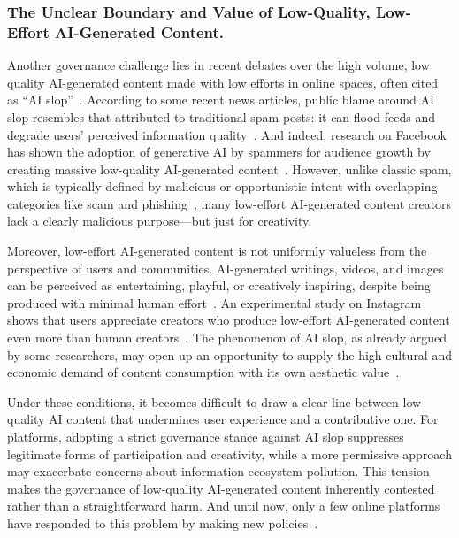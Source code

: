 \subsubsection{The Unclear Boundary and Value of Low-Quality, Low-Effort AI-Generated Content.}
\label{subsubsec:quality}
Another governance challenge lies in recent debates over the high volume, low quality AI-generated content made with low efforts in online spaces, often cited as ``AI slop''~\cite{Gross2025AISlopAP, mahdawi2025slop, hoffman2024first}. According to some recent news articles, public blame around AI slop resembles that attributed to traditional spam posts: it can flood feeds and degrade users' perceived information quality~\cite{mahdawi2025slop, hoffman2024first}. And indeed, research on Facebook has shown the adoption of generative AI by spammers for audience growth by creating massive low-quality AI-generated content~\cite{diresta2024spammers}. However, unlike classic spam, which is typically defined by malicious or opportunistic intent with overlapping categories like scam and phishing~\cite{inuwa2018detection, ferrara2019history}, many low-effort AI-generated content creators lack a clearly malicious purpose---but just for creativity. 

Moreover, low-effort AI-generated content is not uniformly valueless from the perspective of users and communities. AI-generated writings, videos, and images can be perceived as entertaining, playful, or creatively inspiring, despite being produced with minimal human effort~\cite{kommers2026ai, park2024ai}. An experimental study on Instagram shows that users appreciate creators who produce low-effort AI-generated content even more than human creators~\cite{park2024ai}. The phenomenon of AI slop, as already argued by some researchers, may open up an opportunity to supply the high cultural and economic demand of content consumption with its own aesthetic value~\cite{kommers2025slop}.

Under these conditions, it becomes difficult to draw a clear line between low-quality AI content that undermines user experience and a contributive one. For platforms, adopting a strict governance stance against AI slop suppresses legitimate forms of participation and creativity, while a more permissive approach may exacerbate concerns about information ecosystem pollution. This tension makes the governance of low-quality AI-generated content inherently contested rather than a straightforward harm. And until now, only a few online platforms have responded to this problem by making new policies~\cite{gao2026governance}.%


